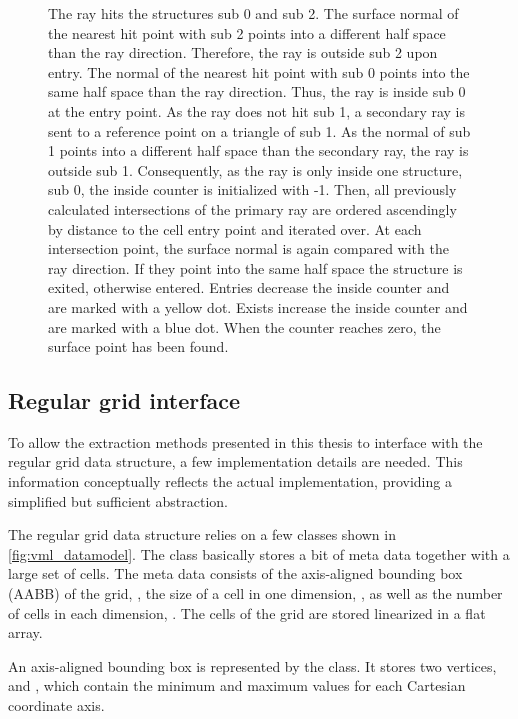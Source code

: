 \begin{figure}
{		The ray hits the structures sub 0 and sub 2.
		The surface normal of the nearest hit point with sub 2 points into a different half space than the ray direction.
		Therefore, the ray is outside sub 2 upon entry.
		The normal of the nearest hit point with sub 0 points into the same half space than the ray direction.
		Thus, the ray is inside sub 0 at the entry point.
		As the ray does not hit sub 1, a secondary ray is sent to a reference point on a triangle of sub 1.
		As the normal of sub 1 points into a different half space than the secondary ray, the ray is outside sub 1.
		Consequently, as the ray is only inside one structure, sub 0, the inside counter is initialized with -1.
		Then, all previously calculated intersections of the primary ray are ordered ascendingly by distance to the cell entry point and iterated over.
		At each intersection point, the surface normal is again compared with the ray direction.
		If they point into the same half space the structure is exited, otherwise entered.
		Entries decrease the inside counter and are marked with a yellow dot.
		Exists increase the inside counter and are marked with a blue dot.
		When the counter reaches zero, the surface point has been found.
	}
	\label{fig:raycast}
\end{figure}


\subsection{Regular grid interface}
\label{sec:vml_implementation}

To allow the extraction methods presented in this thesis to interface with the regular grid data structure, a few implementation details are needed.
This information conceptually reflects the actual implementation, providing a simplified but sufficient abstraction.

The regular grid data structure relies on a few classes shown in \cref{fig:vml_datamodel}.
The  class basically stores a bit of meta data together with a large set of cells.
The meta data consists of the axis-aligned bounding box (AABB) of the grid, , the size of a cell in one dimension, , as well as the number of cells in each dimension, .
The cells of the grid are stored linearized in a flat array.

An axis-aligned bounding box is represented by the  class.
It stores two vertices,  and , which contain the minimum and maximum values for each Cartesian coordinate axis.

